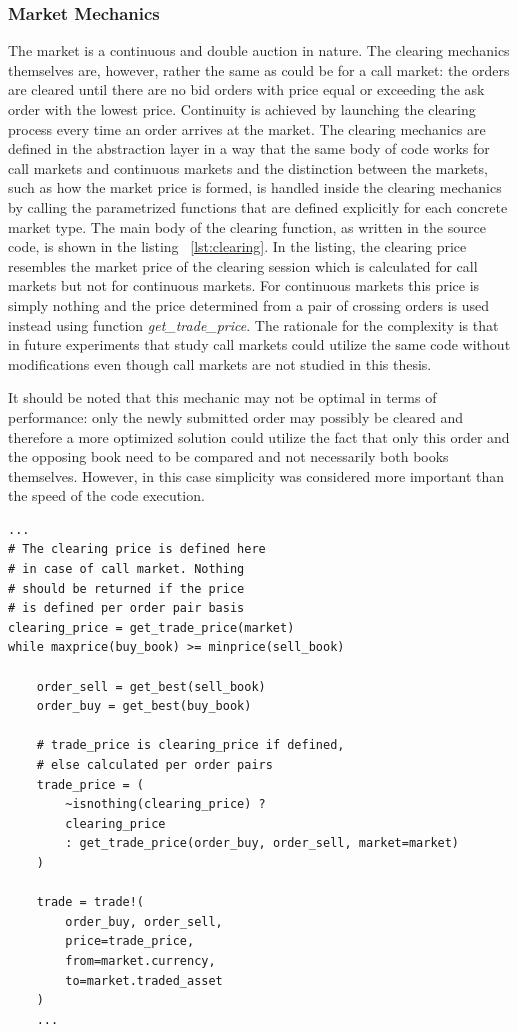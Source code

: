 \subsubsection{Market Mechanics}

The market is a continuous and double auction in nature.
The clearing mechanics themselves are, however, 
rather the same as could be for a call market: 
the orders are cleared until there
are no bid orders with price equal or exceeding the
ask order with the lowest price. 
Continuity is achieved by launching the clearing process
every time an order arrives at the market. 
The clearing mechanics are defined in 
the abstraction layer in a way that the same body
of code works for call markets and continuous markets
and the distinction between the markets, such as how 
the market price is formed, is handled inside the clearing
mechanics by calling the parametrized functions that are 
defined explicitly for each concrete market type. 
The main body of the clearing function, 
as written in the source code, is shown in the listing ~\ref{lst:clearing}.
In the listing, the clearing price resembles the market price
of the clearing session which is calculated for call markets but not for 
continuous markets. For continuous markets this price is simply nothing and
the price determined from a pair of crossing orders is used instead using function
\emph{get\_trade\_price}. The rationale for the complexity is that in future experiments
that study call markets could utilize the same code without modifications 
even though call markets are not studied in this thesis.

It should be noted that this mechanic may not be optimal in terms of performance: 
only the newly submitted order may possibly be cleared and therefore a more 
optimized solution could utilize the fact that only this order and the opposing book 
need to be compared and not necessarily both books themselves. However, 
in this case simplicity was considered more important than the speed of the code execution.


\begin{lstlisting}[caption={Clearing process},label={lst:clearing}]
...
# The clearing price is defined here
# in case of call market. Nothing
# should be returned if the price
# is defined per order pair basis
clearing_price = get_trade_price(market)
while maxprice(buy_book) >= minprice(sell_book)

    order_sell = get_best(sell_book)
    order_buy = get_best(buy_book)
    
    # trade_price is clearing_price if defined,
    # else calculated per order pairs
    trade_price = (
        ~isnothing(clearing_price) ? 
        clearing_price
        : get_trade_price(order_buy, order_sell, market=market)
    )

    trade = trade!(
        order_buy, order_sell, 
        price=trade_price, 
        from=market.currency, 
        to=market.traded_asset
    )
    ...
\end{lstlisting}


